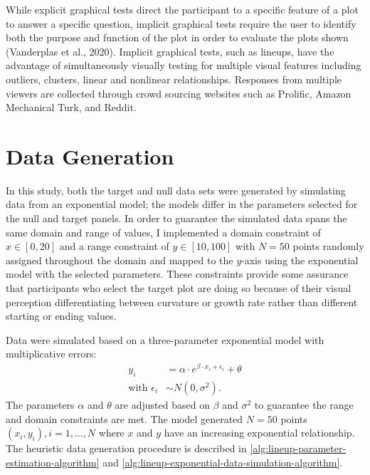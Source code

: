 \documentclass[print]{nuthesis}
\begin{document}
While explicit graphical tests direct the participant to a specific feature of a plot to answer a specific question, implicit graphical tests require the user to identify both the purpose and function of the plot in order to evaluate the plots shown (Vanderplas et al., 2020).
Implicit graphical tests, such as lineups, have the advantage of simultaneously visually testing for multiple visual features including outliers, clusters, linear and nonlinear relationships. Responses from multiple viewers are collected through crowd sourcing websites such as Prolific, Amazon Mechanical Turk, and Reddit.

\hypertarget{data-generation}{%
\section{Data Generation}\label{data-generation}}

In this study, both the target and null data sets were generated by simulating data from an exponential model; the models differ in the parameters selected for the null and target panels.
In order to guarantee the simulated data spans the same domain and range of values, I implemented a domain constraint of \(x\in [0,20]\) and a range constraint of \(y\in [10,100]\) with \(N = 50\) points randomly assigned throughout the domain and mapped to the \(y\)-axis using the exponential model with the selected parameters.
These constraints provide some assurance that participants who select the target plot are doing so because of their visual perception differentiating between curvature or growth rate rather than different starting or ending values.

Data were simulated based on a three-parameter exponential model with multiplicative errors:
\begin{align}
y_i & = \alpha\cdot e^{\beta\cdot x_i + \epsilon_i} + \theta \\
\text{with } \epsilon_i & \sim N(0, \sigma^2). \nonumber
\end{align}
The parameters \(\alpha\) and \(\theta\) are adjusted based on \(\beta\) and \(\sigma^2\) to guarantee the range and domain constraints are met.
The model generated \(N = 50\) points \((x_i, y_i), i = 1,...,N\) where \(x\) and \(y\) have an increasing exponential relationship.
The heuristic data generation procedure is described in \cref{alg:lineup-parameter-estimation-algorithm} and \cref{alg:lineup-exponential-data-simulation-algorithm}.
\end{document}
